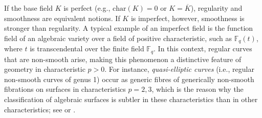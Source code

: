 \documentclass[12pt,reqno]{amsart}%
\theoremstyle{definition}
\theoremstyle{remark}
\newcommand{\ov}{\overline}
\newcommand{\F}{\mathbb{F}}
\newcommand{\OO}{\mathcal{O}}
\begin{document}
If the base field $K$ is perfect (e.g., $\mathrm{char}(K)=0$ or $K = \ov K$),
regularity and smoothness are equivalent notions.
If $K$ is imperfect, however, smoothness is stronger than regularity.
A typical example of an imperfect field is the function field of an algebraic variety over a field of positive characteristic, such as $\F_q(t)$, where $t$ is transcendental over the finite field $\F_q$.
In this context, regular curves that are non-smooth arise, making this phenomenon a distinctive feature of geometry in characteristic $p>0$.
For instance, \emph{quasi-elliptic curves} (i.e., regular non-smooth curves of genus 1) occur as generic fibres of generically non-smooth fibrations on surfaces in characteristics $p=2,3$, which is the reason why the classification of algebraic surfaces is subtler in these characteristics than in other characteristics;
see \cite{BM77,BM76} or \cite[Chapter~4]{CDL23}.










\end{document}
